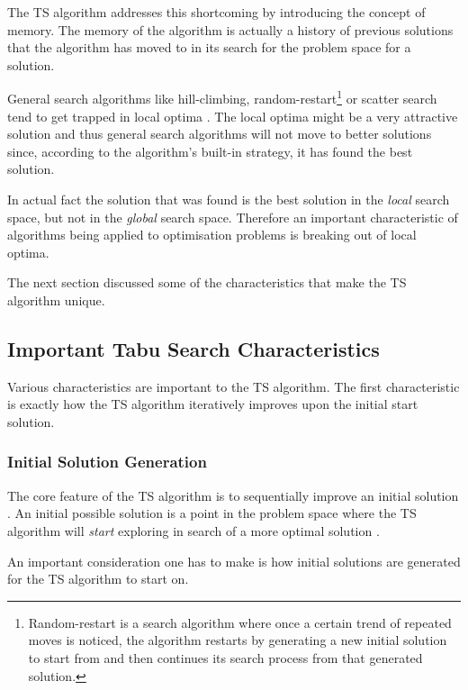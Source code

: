 The TS algorithm addresses this shortcoming by introducing the concept of memory\cite{TabuBiddingStrats}. The memory of the algorithm is actually a history of previous solutions that the algorithm has moved to in its search for the problem space for a solution\cite{TabuBiddingStrats}. 

General search algorithms like hill-climbing, random-restart\footnote{Random-restart is a search algorithm where once a certain trend of repeated moves is noticed, the algorithm restarts by generating a new initial solution to start from and then continues its search process from that generated solution\cite{AIModernApproach}.} or scatter search tend to get trapped in local optima \cite{AIModernApproach}. The local optima might be a very attractive solution and thus general search algorithms will not move to better solutions since, according to the algorithm's built-in strategy, it has found the best solution. 

In actual fact the solution that was found is the best solution in the \emph{local} search space, but not in the \emph{global} search space\cite{CompuIntelligenceIntro,AIModernApproach}. Therefore an important characteristic of algorithms being applied to optimisation problems is breaking out of local optima\cite{CompuIntelligenceIntro,AIModernApproach}.

The next section discussed some of the characteristics that make the TS algorithm unique.

\subsection{Important Tabu Search Characteristics}
\label{sec:TScharacteristics}
Various characteristics are important to the TS algorithm. The first characteristic is exactly how the TS algorithm iteratively improves upon the initial start solution.

\subsubsection{Initial Solution Generation}
The core feature of the TS algorithm is to sequentially improve an initial solution \cite{TSHazardous}. An initial possible solution is a point in the problem space where the TS algorithm will \emph{start} exploring in search of a more optimal solution \cite{AIModernApproach,TSHazardous}.

An important consideration one has to make is how initial solutions are generated for the TS algorithm to start on\cite{AIModernApproach,TSHazardous}.

